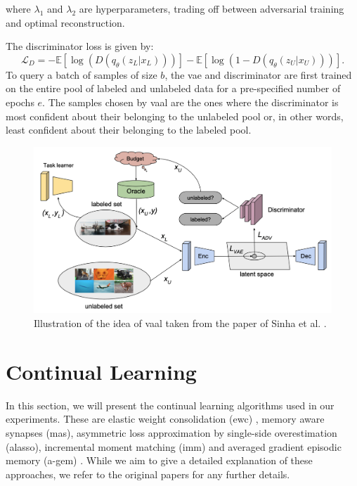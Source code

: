 where $\lambda_1$ and $\lambda_2$ are hyperparameters, trading off between adversarial training and optimal reconstruction. \par
The discriminator loss is given by:
\begin{equation}
    \mathcal{L}_D = - \mathbb{E}[\log(D(q_\theta (z_L | x_L)))] - \mathbb{E}[\log (1- D(q_\theta (z_U | x_U)))].
\end{equation}
To query a batch of samples of size $b$, the \gls{vae} and discriminator are first trained on the entire pool of labeled and unlabeled data for a
pre-specified number of epochs $e$. The samples chosen by \gls{vaal} are the ones where the discriminator is most confident about their belonging to the unlabeled
pool or, in other words, least confident about their belonging to the labeled pool.
\begin{figure} [ht]
    \centering
    \includegraphics[width=.8\linewidth]{images/Vaal_idea.png}
    \caption[Visualization of \gls{vaal}]{Illustration of the idea of \gls{vaal} taken from the paper of Sinha et al. \cite{sinha2019variational}.}
    \label{fig:VAAL}
\end{figure}


\section{Continual Learning}
\label{sec:Related_work:Continual_Learning}
In this section, we will present the continual learning algorithms used in our experiments. These are elastic weight
consolidation (\gls{ewc}) \cite{kirkpatrick2017overcoming}, memory aware synapses (\gls{mas}), asymmetric loss approximation by single-side overestimation
(\gls{alasso}), incremental moment matching (\gls{imm}) and averaged gradient episodic memory (\gls{a-gem}) \cite{lopez2017gradient}. While we aim to give
a detailed explanation of these approaches, we refer to the original papers for any further details. \par

